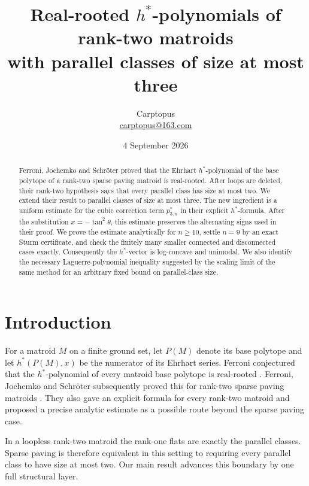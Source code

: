 \documentclass[11pt]{article}
\title{Real-rooted $h^*$-polynomials of rank-two matroids\\
with parallel classes of size at most three}
\author{Carptopus\\\href{mailto:carptopus@163.com}{carptopus@163.com}}
\date{4 September 2026}
\begin{document}
\maketitle

\begin{center}
\end{center}

\begin{abstract}


Ferroni, Jochemko and Schröter proved that the Ehrhart $h^*$-polynomial of
the base polytope of a rank-two sparse paving matroid is real-rooted. After
loops are deleted, their rank-two hypothesis says that every parallel class
has size at most two. We extend their result to parallel classes of size at
most three. The
new ingredient is a uniform estimate for the cubic correction term
$p^*_{3,n}$ in their explicit $h^*$-formula. After the substitution
$x=-\tan^2\theta$, this estimate preserves the alternating signs used in
their proof. We prove the estimate analytically for $n\ge 10$, settle
$n=9$ by an exact Sturm certificate, and check the finitely many smaller
connected and disconnected cases exactly. Consequently the $h^*$-vector is
log-concave and unimodal. We also identify the necessary Laguerre-polynomial
inequality suggested by the scaling limit of the same method for an
arbitrary fixed bound on parallel-class size.

\end{abstract}

\section{Introduction}


For a matroid $M$ on a finite ground set, let $P(M)$ denote its base
polytope and let $h^*(P(M),x)$ be the numerator of its Ehrhart series. Ferroni
conjectured that the $h^*$-polynomial of every matroid base polytope is
real-rooted \cite{ferroni-minimal}. Ferroni, Jochemko and Schröter subsequently proved this for
rank-two sparse paving matroids \cite{fjs}. They also gave an explicit formula for
every rank-two matroid and proposed a precise analytic estimate as a possible
route beyond the sparse paving case.

In a loopless rank-two matroid the rank-one flats are exactly the parallel
classes. Sparse paving is therefore equivalent in this setting to requiring
every parallel class to have size at most two. Our main result advances this
boundary by one full structural layer.
\end{document}
